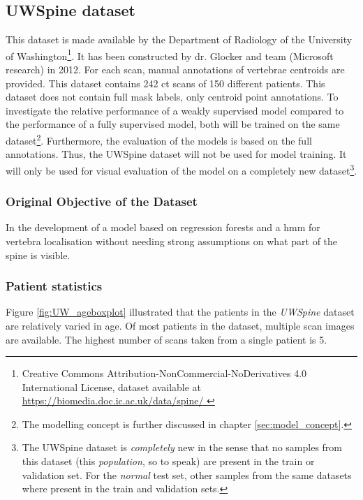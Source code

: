 \subsection{UWSpine dataset}
 
This dataset is made available by the Department of Radiology of the University of Washington\footnote{Creative Commons Attribution-NonCommercial-NoDerivatives 4.0 International License, dataset available at \url{
      https://biomedia.doc.ic.ac.uk/data/spine/  
    }}.
It has been constructed by dr. Glocker and team \cite{Glocker2012,Glocker2013} (Microsoft research) in 2012.
For each scan, manual annotations of vertebrae centroids are provided.
This dataset contains 242 \acrshort{ct} scans of 150 different patients.
This dataset does not contain full mask labels, only centroid point annotations.
To investigate the relative performance of a weakly supervised model compared to the performance of a fully supervised model, both will be trained on the same dataset\footnote{The modelling concept is further discussed in chapter \ref{sec:model_concept}.}.
Furthermore, the evaluation of the models is based on the full annotations.
Thus, the UWSpine dataset will not be used for model training.
It will only be used for visual evaluation of the model on a completely new dataset\footnote{The UWSpine dataset is \textit{completely} new in the sense that no samples from this dataset (this \textit{population}, so to speak) are present in the train or validation set.
For the \textit{normal} test set, other samples from the same datasets where present in the train and validation sets.}.


\subsubsection{Original Objective of the Dataset}

In \cite{Glocker2012,Glocker2013} the development of a model based on regression forests and a \acrfull{hmm} for vertebra localisation without needing strong assumptions on what part of the spine is visible.

\subsubsection{Patient statistics}


Figure \ref{fig:UW_ageboxplot} illustrated that the patients in the \textit{UWSpine} dataset are relatively varied in age.
Of most patients in the dataset, multiple scan images are available.
The highest number of scans taken from a single patient is 5.

